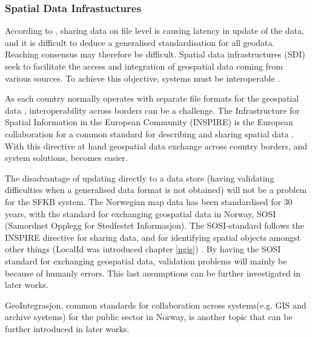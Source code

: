 \subsubsection{Spatial Data Infrastuctures}

According to \cite{Peng2005}, sharing data on file level is causing latency in update of the data, and it is difficult to deduce a generalised standardisation for all geodata. Reaching consensus may therefore be difficult.  Spatial data infrastructures (SDI) seek to facilitate the access and integration of geospatial data coming from various sources. To achieve this objective, systems must be interoperable \citep{giuliani2013}. 

As each country normally operates with separate file formats for the geospatial data \citep{Frenvik2017a}, interoperability across borders can be a challenge. The Infrastructure for Spatial Information in the European Community (INSPIRE) is the European collaboration for a common standard for describing and sharing spatial data \citep{INSPIRE}. With this directive at hand geospatial data exchange across country borders, and system solutions, becomes easier. 



The disadvantage of updating directly to a data store (having validating difficulties when a generalised data format is not obtained) will not be a problem for the SFKB system. The Norwegian map data has been standardised for 30 years, with the standard for exchanging geospatial data in Norway, SOSI (Samordnet Opplegg for Stedfestet Informasjon). The SOSI-standard follows the INSPIRE directive for sharing data, and for identifying spatial objects amongst other things (LocalId was introduced chapter \ref{ngis}) \citep{Kartverket2012, Hokstad2016}. By having the SOSI standard for exchanging geospatial data, validation problems will mainly be because of humanly errors. This last assumptions can be further investigated in later works. 

GeoIntegrasjon, common standards for collaboration across systems(e.g. GIS and archive systems) for the public sector in Norway, is another topic that can be further introduced in later works. 



